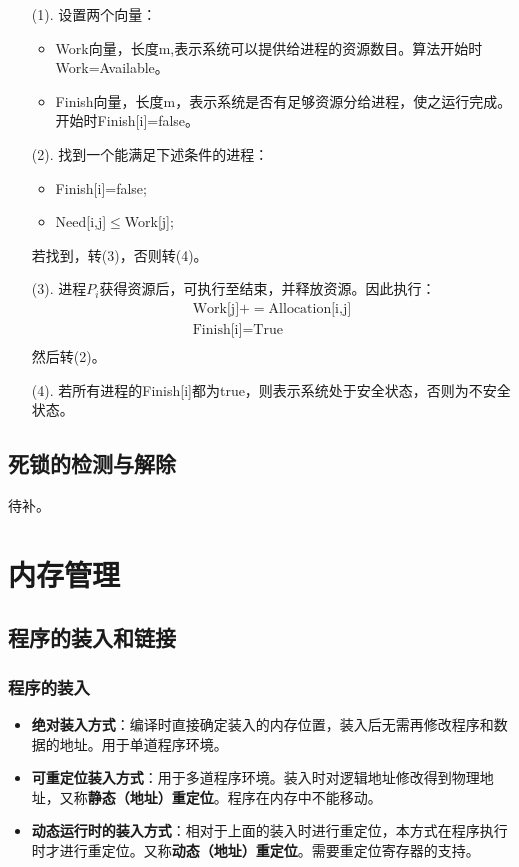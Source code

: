 \documentclass[12pt, a4paper, oneside]{ctexart}
\begin{document}
\begin{enumerate}
    \item [(1). ] 设置两个向量：
    \begin{itemize}
        \item Work向量，长度m,表示系统可以提供给进程的资源数目。算法开始时Work=Available。
        \item Finish向量，长度m，表示系统是否有足够资源分给进程，使之运行完成。开始时Finish[i]=false。
    \end{itemize}
    \item [(2). ] 找到一个能满足下述条件的进程：
    \begin{itemize}
        \item Finish[i]=false;
        \item Need[i,j]$\leq$Work[j];
    \end{itemize}
    若找到，转(3)，否则转(4)。
    \item [(3). ] 进程$P_i$获得资源后，可执行至结束，并释放资源。因此执行：
    \begin{gather*}
        \text{Work[j]}+=\text{Allocation[i,j]}\\
        \text{Finish[i]}=\text{True}\\
    \end{gather*}
    然后转(2)。
    \item [(4). ] 若所有进程的Finish[i]都为true，则表示系统处于安全状态，否则为不安全状态。
\end{enumerate}

\subsection{死锁的检测与解除}

待补。

\newpage
\section{内存管理}

\subsection{程序的装入和链接}

\subsubsection{程序的装入}

\begin{itemize}
    \item \textbf{绝对装入方式}：编译时直接确定装入的内存位置，装入后无需再修改程序和数据的地址。用于单道程序环境。
    \item \textbf{可重定位装入方式}：用于多道程序环境。装入时对逻辑地址修改得到物理地址，又称\textbf{静态（地址）重定位}。程序在内存中不能移动。
    \item \textbf{动态运行时的装入方式}：相对于上面的装入时进行重定位，本方式在程序执行时才进行重定位。又称\textbf{动态（地址）重定位}。需要重定位寄存器的支持。
\end{itemize}
\end{document}
